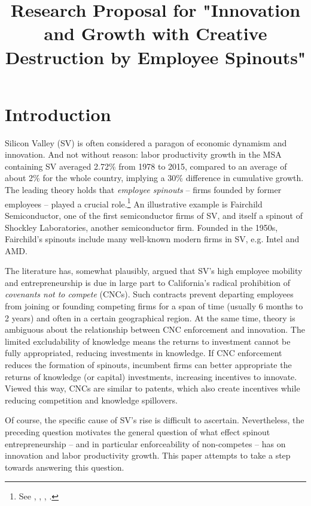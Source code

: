 \documentclass[11pt,english]{article}
\theoremstyle{remark}
\begin{document}
	
	
	
\title{Research Proposal for "Innovation and Growth with Creative Destruction by Employee Spinouts"}
\maketitle

\section{Introduction}

Silicon Valley (SV) is often considered a paragon of economic dynamism and innovation. And not without reason: labor productivity growth in the MSA containing SV averaged 2.72\% from 1978 to 2015, compared to an average of about 2\% for the whole country, implying a 30\% difference in cumulative growth. The leading theory holds that \textit{employee spinouts} -- firms founded by former employees --  played a crucial role.\footnote{See \cite{saxenian_regional_1994}, \cite{gilson_legal_1999}, \cite{fallick_job-hopping_2006}, \cite{franco_covenants_2008}.} An illustrative example is Fairchild Semiconductor, one of the first semiconductor firms of SV, and itself a spinout of Shockley Laboratories, another semiconductor firm. Founded in the 1950s, Fairchild's spinouts include many well-known modern firms in SV, e.g. Intel and AMD. 

The literature has, somewhat plausibly, argued that SV's high employee mobility and entrepreneurship is due in large part to California's radical prohibition of \textit{covenants not to compete } (CNCs). Such contracts prevent departing employees from joining or founding competing firms for a span of time (usually 6 months to 2 years) and often in a certain geographical region. At the same time, theory is ambiguous about the relationship between CNC enforcement and innovation. The limited excludability of knowledge means the returns to investment cannot be fully appropriated, reducing investments in knowledge. If CNC enforcement reduces the formation of spinouts, incumbent firms can better appropriate the returns of knowledge (or capital) investments, increasing incentives to innovate. Viewed this way, CNCs are similar to patents, which also create incentives while reducing competition and knowledge spillovers.

Of course, the specific cause of SV's rise is difficult to ascertain. Nevertheless, the preceding question motivates the general question of what effect spinout entrepreneurship -- and in particular enforceability of non-competes -- has on innovation and labor productivity growth. This paper attempts to take a step towards answering this question.
\end{document}
